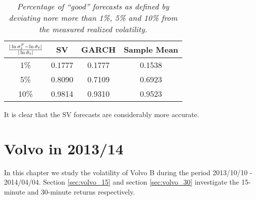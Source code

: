 \begin{table}[htb!]
  \centering
  \begin{tabular}{|c|c|c|c|}
    \hline
    ${|\ln \sigma^F_t - \ln \hat{\sigma}_t| \over |\ln
      \hat{\sigma}_t|}$ &
    SV & GARCH & Sample Mean \\
    \hline
    1\% & 0.1777 & 0.1777 & 0.1538 \\
    \hline
    5\% & 0.8090 & 0.7109 & 0.6923 \\
    \hline
    10\% & 0.9814 & 0.9310 & 0.9523 \\
    \hline
  \end{tabular}
  \caption{\small \it Percentage of ``good'' forecasts as defined by
    deviating nore more than 1\%, 5\% and 10\% from the measured
    realized volatility.}
  \label{tab:nordea3_diff_2}
\end{table}
It is clear that the SV forecasts are considerably more accurate.

\chapter{Volvo in 2013/14}\label{sec:volvo}
In this chapter we study the volatility of Volvo B during the period
2013/10/10 - 2014/04/04. Section \ref{sec:volvo_15} and section \ref{sec:volvo_30}
investigate the 15-minute and 30-minute returns respectively.


